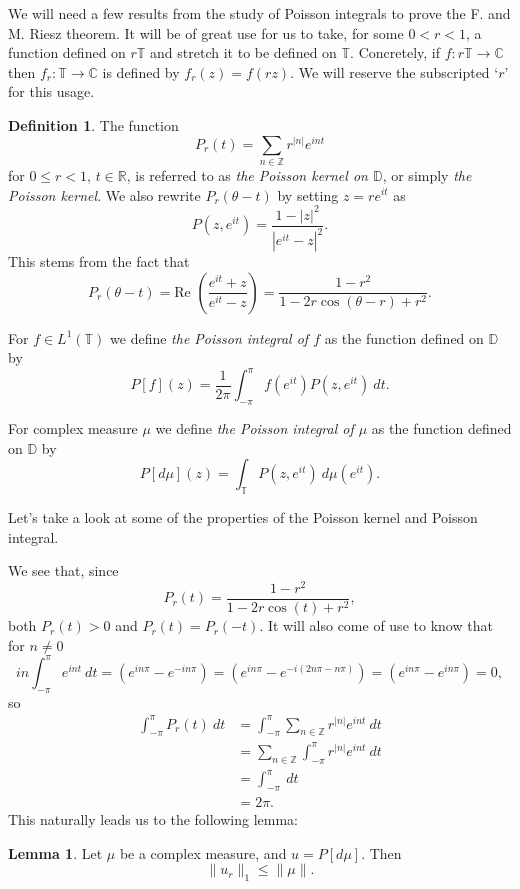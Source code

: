 \documentclass[a4paper,12pt,twoside,BCOR=10mm]{scrbook}
\theoremstyle{definition}
\theoremstyle{definition}
\newtheorem{lemma}[theorem]{Lemma}
\theoremstyle{definition}
\newtheorem{definition}[theorem]{Definition}
\renewcommand{\Re}{\text{Re }}
\begin{document}
We will need a few results from the study of Poisson integrals to prove the F. and M. Riesz theorem.
It will be of great use for us to take, for some $0 < r < 1$, a function defined on $r\mathbb{T}$ and stretch it to be defined on $\mathbb{T}$.
Concretely, if $f: r\mathbb{T} \rightarrow \mathbb{C}$ then $f_r: \mathbb{T} \rightarrow \mathbb{C}$ is defined by $f_r(z) = f(rz)$.
We will reserve the subscripted `$r$' for this usage.
\begin{definition}
The function
\[
	P_r(t) = \sum_{n \in \mathbb{Z}} r^{|n|}e^{int}
\]
for $0 \leq r < 1$, $t \in \mathbb{R}$, is referred to as \emph{the Poisson kernel on $\mathbb{D}$}, or simply \emph{the Poisson kernel}.
We also rewrite $P_r(\theta - t)$ by setting $z = re^{it}$ as
\[
	P(z, e^{it}) = \frac{1 - |z|^2}{|e^{it} - z|^2}.
\]
This stems from the fact that
\[
	P_r(\theta - t) = \Re \left ( \frac{e^{it} + z}{e^{it} - z}\right ) = \frac{1 - r^2}{1 - 2r\cos(\theta - r) + r^2}.
\]

For $f \in L^1(\mathbb{T})$ we define \emph{the Poisson integral of $f$} as the function defined on $\mathbb{D}$ by
\[
	P[f](z) = \frac{1}{2\pi} \int_{-\pi}^{\pi} f(e^{it})P(z, e^{it})\ dt.
\]

For complex measure $\mu$ we define \emph{the Poisson integral of $\mu$} as the function defined on $\mathbb{D}$ by
\[
	P[d\mu](z) = \int_{\mathbb{T}} P(z, e^{it})\ d\mu(e^{it}).
\]

Let's take a look at some of the properties of the Poisson kernel and Poisson integral.
\end{definition}
We see that, since
\[
	P_r(t) = \frac{1 - r^2}{1 - 2r\cos(t) + r^2},
\]
both $P_r(t) > 0$ and $P_r(t) = P_r(-t)$.
It will also come of use to know that for $n \neq 0$
\[
	in\int_{-\pi}^{\pi} e^{int}\ dt
	= (e^{in\pi} - e^{-in\pi})
	= (e^{in\pi} - e^{-i(2n\pi - n\pi)})
	= (e^{in\pi} - e^{in\pi})
	= 0,
\]
so
\begin{align*}
	\int_{-\pi}^{\pi} P_r(t)\ dt
	&= \int_{-\pi}^{\pi} \sum_{n \in \mathbb{Z}} r^{|n|}e^{int}\ dt\\
	&= \sum_{n \in \mathbb{Z}} \int_{-\pi}^{\pi} r^{|n|}e^{int}\ dt\\
	&= \int_{-\pi}^{\pi}\ dt\\
	&= 2\pi.
\end{align*}
This naturally leads us to the following lemma:
\begin{lemma}
\label{FMRlemma1}
Let $\mu$ be a complex measure, and $u = P[d\mu]$.
Then
\[
	\|u_r\|_1 \leq \|\mu\|.
\]
\end{lemma}
\end{document}
